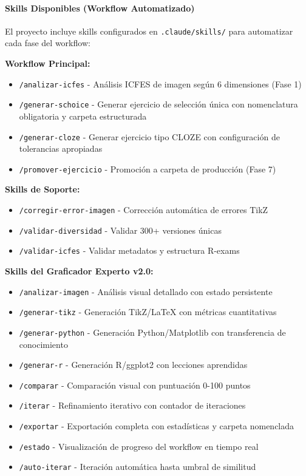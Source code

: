 \documentclass[
]{article}
\providecommand{\tightlist}{%
  \setlength{\itemsep}{0pt}\setlength{\parskip}{0pt}}
\begin{document}
\paragraph{\texorpdfstring{\textbf{Skills Disponibles} (Workflow
Automatizado)}{Skills Disponibles (Workflow Automatizado)}}\label{skills-disponibles-workflow-automatizado}

El proyecto incluye skills configurados en \texttt{.claude/skills/} para
automatizar cada fase del workflow:

\textbf{Workflow Principal:}

\begin{itemize}
\tightlist
\item
  \texttt{/analizar-icfes} - Análisis ICFES de imagen según 6
  dimensiones (Fase 1)
\item
  \texttt{/generar-schoice} - Generar ejercicio de selección única con
  nomenclatura obligatoria y carpeta estructurada
\item
  \texttt{/generar-cloze} - Generar ejercicio tipo CLOZE con
  configuración de tolerancias apropiadas
\item
  \texttt{/promover-ejercicio} - Promoción a carpeta de producción (Fase
  7)
\end{itemize}

\textbf{Skills de Soporte:}

\begin{itemize}
\tightlist
\item
  \texttt{/corregir-error-imagen} - Corrección automática de errores
  TikZ
\item
  \texttt{/validar-diversidad} - Validar 300+ versiones únicas
\item
  \texttt{/validar-icfes} - Validar metadatos y estructura R-exams
\end{itemize}

\textbf{Skills del Graficador Experto v2.0:}

\begin{itemize}
\tightlist
\item
  \texttt{/analizar-imagen} - Análisis visual detallado con estado
  persistente
\item
  \texttt{/generar-tikz} - Generación TikZ/LaTeX con métricas
  cuantitativas
\item
  \texttt{/generar-python} - Generación Python/Matplotlib con
  transferencia de conocimiento
\item
  \texttt{/generar-r} - Generación R/ggplot2 con lecciones aprendidas
\item
  \texttt{/comparar} - Comparación visual con puntuación 0-100 puntos
\item
  \texttt{/iterar} - Refinamiento iterativo con contador de iteraciones
\item
  \texttt{/exportar} - Exportación completa con estadísticas y carpeta
  nomenclada
\item
  \texttt{/estado} - Visualización de progreso del workflow en tiempo
  real
\item
  \texttt{/auto-iterar} - Iteración automática hasta umbral de similitud
\end{itemize}
\end{document}
